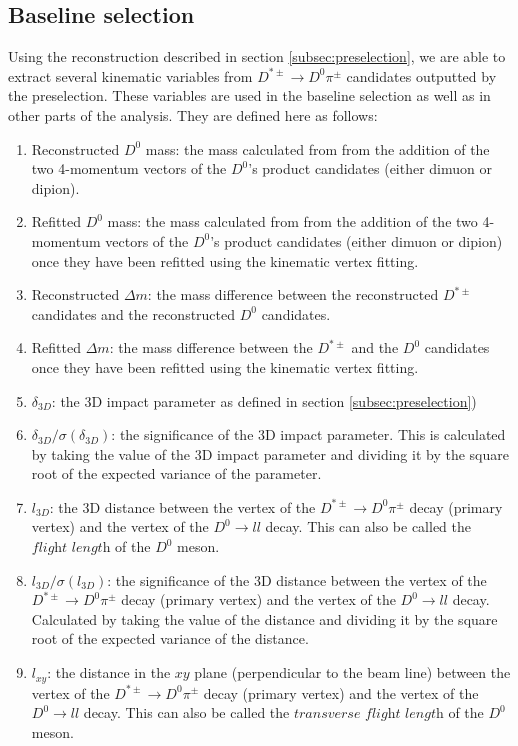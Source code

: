 \subsection{Baseline selection}

Using the reconstruction described in section \ref{subsec:preselection}, we are able to extract several kinematic variables from $D^{*\pm} \to D^0 \pi^\pm$ candidates outputted by the preselection. These variables are used in the baseline selection as well as in other parts of the analysis. They are defined here as follows:
\begin{enumerate}
    \item Reconstructed $D^0$ mass: the mass calculated from from the addition of the two 4-momentum vectors of the $D^0$'s product candidates (either dimuon or dipion). 
    \item Refitted $D^0$ mass: the mass calculated from from the addition of the two 4-momentum vectors of the $D^0$'s product candidates (either dimuon or dipion) once they have been refitted using the kinematic vertex fitting. 
    \item Reconstructed $\Delta m$: the mass difference between the reconstructed $D^{*\pm}$ candidates and the reconstructed $D^0$ candidates. 
    \item Refitted $\Delta m$: the mass difference between the $D^{*\pm}$ and the $D^0$ candidates once they have been refitted using the kinematic vertex fitting.
    \item $\delta_{3D}$: the 3D impact parameter as defined in section \ref{subsec:preselection})
    \item $\delta_{3D}/\sigma\left(\delta_{3D}\right)$: the significance of the 3D impact parameter. This is calculated by taking the value of the 3D impact parameter and dividing it by the square root of the expected variance of the parameter. 
    \item $l_{3D}$: the 3D distance between the vertex of the $D^{*\pm} \to D^0 \pi^\pm$ decay (primary vertex) and the vertex of the $D^0 \to l l$ decay. This can also be called the $\textit{flight length}$ of the $D^0$ meson. 
    \item $l_{3D}/\sigma\left(l_{3D}\right)$: the significance of the 3D distance between the vertex of the $D^{*\pm} \to D^0 \pi^\pm$ decay (primary vertex) and the vertex of the $D^0 \to l l$ decay. Calculated by taking the value of the distance and dividing it by the square root of the expected variance of the distance. 
    \item $l_{xy}$: the distance in the $xy$ plane (perpendicular to the beam line) between the vertex of the $D^{*\pm} \to D^0 \pi^\pm$ decay (primary vertex) and the vertex of the $D^0 \to l l$ decay.  This can also be called the $\textit{transverse flight length}$ of the $D^0$ meson. 

\end{enumerate}
